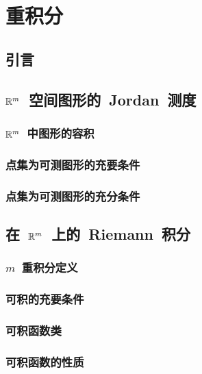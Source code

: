 

\chapter{重积分}\label{ch:20}
\section{引\emspace 言}
\section{$\mathbb{R}^m$~空间图形的~Jordan~测度}
\subsection{$\mathbb{R}^m$~中图形的容积}
\subsection{点集为可测图形的充要条件}
\subsection{点集为可测图形的充分条件}
\begin{exercise}
\item
\end{exercise}
\section{在~$\mathbb{R}^m$~上的~Riemann~积分}
\subsection{$m$~重积分定义}
\subsection{可积的充要条件}
\subsection{可积函数类}
\subsection{可积函数的性质}
\begin{exercise}
\item
\end{exercise}
